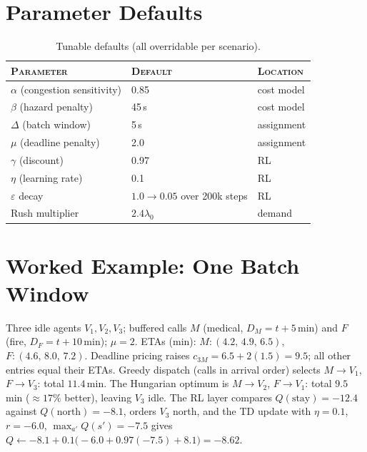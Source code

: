 \documentclass[11pt,a4paper]{article}
\theoremstyle{spaceddef}
\theoremstyle{spacedplain}
\begin{document}
\section{Parameter Defaults}
\begin{table}[H]\centering\small
\begin{tabular}{@{}lll@{}}
\toprule
\textsc{Parameter} & \textsc{Default} & \textsc{Location} \\
\midrule
$\alpha$ (congestion sensitivity) & 0.85 & cost model \\
$\beta$ (hazard penalty) & 45\,s & cost model \\
$\Delta$ (batch window) & 5\,s & assignment \\
$\mu$ (deadline penalty) & 2.0 & assignment \\
$\gamma$ (discount) & 0.97 & RL \\
$\eta$ (learning rate) & 0.1 & RL \\
$\varepsilon$ decay & $1.0\to0.05$ over 200k steps & RL \\
Rush multiplier & $2.4\lambda_0$ & demand \\
\bottomrule
\end{tabular}
\caption{Tunable defaults (all overridable per scenario).}
\end{table}

\section{Worked Example: One Batch Window}
Three idle agents $V_1,V_2,V_3$; buffered calls $M$ (medical, $D_M=t+5$\,min) and
$F$ (fire, $D_F=t+10$\,min); $\mu=2$. ETAs (min): $M:(4.2,\,4.9,\,6.5)$,
$F:(4.6,\,8.0,\,7.2)$. Deadline pricing raises $c_{3M}=6.5+2(1.5)=9.5$; all other
entries equal their ETAs. Greedy dispatch (calls in arrival order) selects
$M\!\to\!V_1$, $F\!\to\!V_3$: total $11.4$\,min. The Hungarian optimum is
$M\!\to\!V_2$, $F\!\to\!V_1$: total $9.5$\,min ($\approx17\%$ better), leaving
$V_3$ idle. The RL layer compares $Q(\text{stay})=-12.4$ against
$Q(\text{north})=-8.1$, orders $V_3$ north, and the TD update with $\eta=0.1$,
$r=-6.0$, $\max_{a'}Q(s')=-7.5$ gives
$Q\leftarrow -8.1+0.1\bigl(-6.0+0.97(-7.5)+8.1\bigr)=-8.62$.
\end{document}
